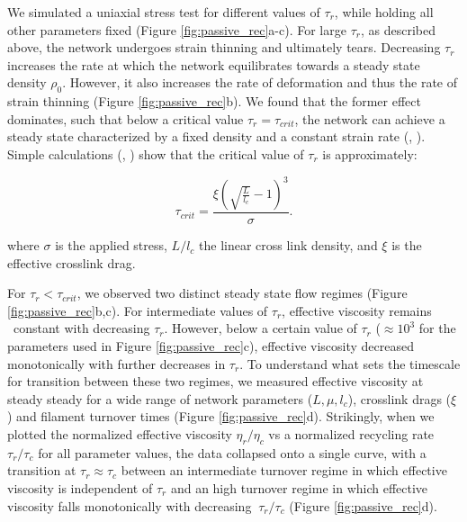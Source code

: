 \documentclass[10pt,letterpaper]{article}
\begin{document}
We simulated a uniaxial stress test for different values of $\tau_r$, while holding all other parameters fixed (Figure \ref{fig:passive_rec}a-c). For large $\tau_r$, as described above, the network undergoes strain thinning and ultimately tears.  Decreasing $\tau_r$ increases the rate at which the network equilibrates towards a steady state density $\rho_0$.  However, it also increases the rate of deformation and thus the rate of strain thinning (Figure \ref{fig:passive_rec}b).  We found that the former effect dominates, such that below a critical value $\tau_r = \tau_{crit}$, the network can achieve a steady state characterized by a fixed density and a constant strain rate (, ).  Simple calculations (, ) show that the critical value of $\tau_r$ is approximately:

\begin{equation}
\label{eqn:syst3}
\tau_{crit} = \frac{\xi {\left (\sqrt{\frac{L}{l_c}}-1 \right )}^3}{\sigma}.
\end{equation}

where  $\sigma$ is the applied stress, $L/l_c$ the linear cross link density, and $\xi$ is the effective crosslink drag. 

For $\tau_r < \tau_{crit}$, we observed two distinct steady state flow regimes (Figure \ref{fig:passive_rec}b,c). For intermediate values of $\tau_r$, effective viscosity remains ~constant with decreasing $\tau_r$.  However, below a certain value of  $\tau_r$ ($\approx 10^3$ for the parameters used in Figure \ref{fig:passive_rec}c),  effective viscosity decreased monotonically with further decreases in $\tau_r$. To understand what sets the timescale for transition between these two regimes,  we measured effective viscosity at steady steady for a wide range of  network parameters ($L, \mu, {l_c}$), crosslink drags ($\xi$) and filament turnover times (Figure \ref{fig:passive_rec}d). Strikingly, when we plotted the normalized effective viscosity $\eta_r/\eta_c$ vs a normalized recycling rate $\tau_r/\tau_c$ for all parameter values, the data collapsed onto a single curve, with a transition at  $\tau_r \approx \tau_c$  between an intermediate turnover regime in which effective viscosity is independent of $\tau_r$  and an high turnover regime in which effective viscosity falls monotonically with decreasing $~\tau_r/\tau_c$  (Figure \ref{fig:passive_rec}d). 
 
\end{document}
